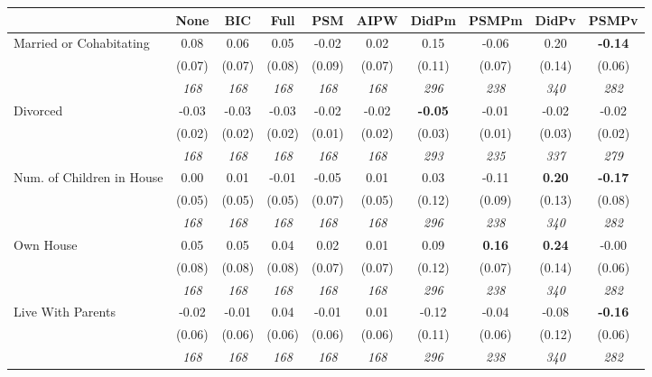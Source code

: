 \begin{tabular}{l c c c c c c c c c}
\toprule
 & None & BIC & Full & PSM & AIPW & DidPm & PSMPm & DidPv & PSMPv \\
\midrule
Married or Cohabitating & 0.08 & 0.06 & 0.05 & -0.02 & 0.02 & 0.15 & -0.06 & 0.20 & \textbf{-0.14} \\
& (0.07) & (0.07) & (0.08) & (0.09) & (0.07) & (0.11) & (0.07) & (0.14) & (0.06) \\
& \textit{ 168 } & \textit{ 168 } & \textit{ 168 } & \textit{ 168 } & \textit{ 168 } & \textit{ 296 } & \textit{ 238 } & \textit{ 340 } & \textit{ 282 } \\
Divorced & -0.03 & -0.03 & -0.03 & -0.02 & -0.02 & \textbf{ -0.05 } & -0.01 & -0.02 & -0.02 \\
& (0.02) & (0.02) & (0.02) & (0.01) & (0.02) & (0.03) & (0.01) & (0.03) & (0.02) \\
& \textit{ 168 } & \textit{ 168 } & \textit{ 168 } & \textit{ 168 } & \textit{ 168 } & \textit{ 293 } & \textit{ 235 } & \textit{ 337 } & \textit{ 279 } \\
Num. of Children in House & 0.00 & 0.01 & -0.01 & -0.05 & 0.01 & 0.03 & -0.11 & \textbf{ 0.20 } & \textbf{-0.17} \\
& (0.05) & (0.05) & (0.05) & (0.07) & (0.05) & (0.12) & (0.09) & (0.13) & (0.08) \\
& \textit{ 168 } & \textit{ 168 } & \textit{ 168 } & \textit{ 168 } & \textit{ 168 } & \textit{ 296 } & \textit{ 238 } & \textit{ 340 } & \textit{ 282 } \\
Own House & 0.05 & 0.05 & 0.04 & 0.02 & 0.01 & 0.09 & \textbf{0.16} & \textbf{ 0.24 } & -0.00 \\
& (0.08) & (0.08) & (0.08) & (0.07) & (0.07) & (0.12) & (0.07) & (0.14) & (0.06) \\
& \textit{ 168 } & \textit{ 168 } & \textit{ 168 } & \textit{ 168 } & \textit{ 168 } & \textit{ 296 } & \textit{ 238 } & \textit{ 340 } & \textit{ 282 } \\
Live With Parents & -0.02 & -0.01 & 0.04 & -0.01 & 0.01 & -0.12 & -0.04 & -0.08 & \textbf{-0.16} \\
& (0.06) & (0.06) & (0.06) & (0.06) & (0.06) & (0.11) & (0.06) & (0.12) & (0.06) \\
& \textit{ 168 } & \textit{ 168 } & \textit{ 168 } & \textit{ 168 } & \textit{ 168 } & \textit{ 296 } & \textit{ 238 } & \textit{ 340 } & \textit{ 282 } \\
\bottomrule
\end{tabular}
